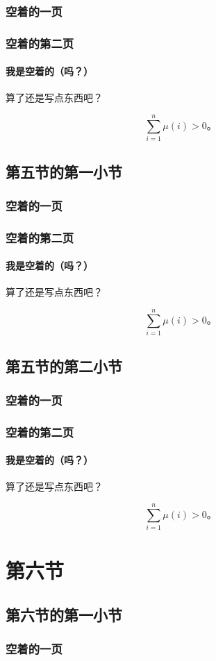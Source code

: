 \documentclass{../pkslide}
\begin{document}
\begin{frame}
  \frametitle{空着的一页}
\end{frame}

\begin{frame}
  \frametitle{空着的第二页}
  \framesubtitle{我是空着的（吗？）}
  
  算了还是写点东西吧？
  
  \[ \sum_{i = 1}^{n} \mu(i) > 0 \text{。} \]
\end{frame}

\subsection{第五节的第一小节}

\begin{frame}
  \frametitle{空着的一页}
\end{frame}

\begin{frame}
  \frametitle{空着的第二页}
  \framesubtitle{我是空着的（吗？）}
  
  算了还是写点东西吧？
  
  \[ \sum_{i = 1}^{n} \mu(i) > 0 \text{。} \]
\end{frame}

\subsection{第五节的第二小节}

\begin{frame}
  \frametitle{空着的一页}
\end{frame}

\begin{frame}
  \frametitle{空着的第二页}
  \framesubtitle{我是空着的（吗？）}
  
  算了还是写点东西吧？
  
  \[ \sum_{i = 1}^{n} \mu(i) > 0 \text{。} \]
\end{frame}

\section{第六节}

\subsection{第六节的第一小节}

\begin{frame}
  \frametitle{空着的一页}
\end{frame}
\end{document}
